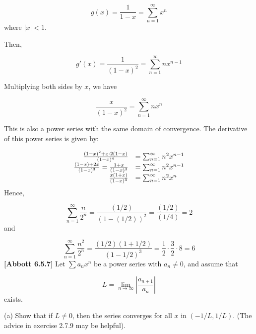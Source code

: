 \documentclass[10pt]{article}
\begin{document}
\begin{equation*}
g( x) =\frac{1}{1-x} =\sum _{n=1}^{\infty } x^{n}
\end{equation*}
where $\displaystyle |x|< 1$. 



Then,


\begin{equation*}
g'( x) =\frac{1}{( 1-x)^{2}} =\sum _{n=1}^{\infty } nx^{n-1}
\end{equation*}


Multiplying both sides by $\displaystyle x$, we have


\begin{equation*}
\frac{x}{( 1-x)^{2}} =\sum _{n=1}^{\infty } nx^{n}
\end{equation*}


This is also a power series with the same domain of convergence. The derivative of this power series is given by:


\begin{equation*}
\begin{array}{ r l }
\frac{( 1-x)^{2} +x\cdot 2( 1-x)}{( 1-x)^{4}} & =\sum _{n=1}^{\infty } n^{2} x^{n-1}\\
\frac{( 1-x) +2x}{( 1-x)^{3}} =\frac{1+x}{( 1-x)^{3}} & =\sum _{n=1}^{\infty } n^{2} x^{n-1}\\
\frac{x( 1+x)}{( 1-x)^{3}} & =\sum _{n=1}^{\infty } n^{2} x^{n}
\end{array}
\end{equation*}
Hence,


\begin{equation*}
\sum _{n=1}^{\infty }\frac{n}{2^{n}} =\frac{( 1/2)}{( 1-( 1/2))^{2}} =\frac{( 1/2)}{( 1/4)} =2
\end{equation*}
and


\begin{equation*}
\sum _{n=1}^{\infty }\frac{n^{2}}{2^{n}} =\frac{( 1/2)( 1+1/2)}{( 1-1/2)^{3}} =\frac{1}{2} \cdot \frac{3}{2} \cdot 8=6
\end{equation*}
\textbf{[Abbott 6.5.7]} Let $\displaystyle \sum a_{n} x^{n}$ be a power series with $\displaystyle a_{n} \neq 0$, and assume that 


\begin{equation*}
L=\lim _{n\rightarrow \infty }\left| \frac{a_{n+1}}{a_{n}}\right| 
\end{equation*}
exists.



(a) Show that if $\displaystyle L\neq 0$, then the series converges for all $\displaystyle x$ in $\displaystyle ( -1/L,1/L)$. (The advice in exercise 2.7.9 may be helpful).
\end{document}
